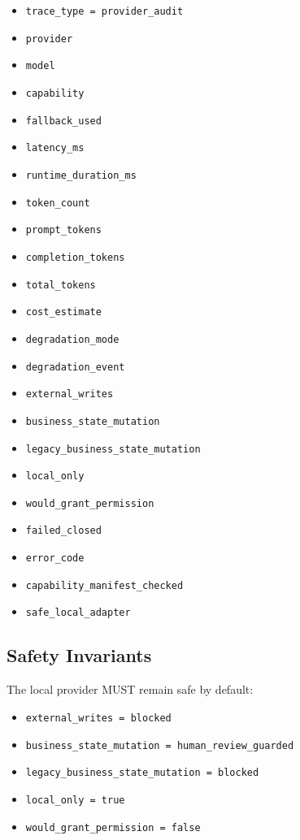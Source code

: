 \begin{itemize}
  \item \texttt{trace\_type = provider\_audit}
  \item \texttt{provider}
  \item \texttt{model}
  \item \texttt{capability}
  \item \texttt{fallback\_used}
  \item \texttt{latency\_ms}
  \item \texttt{runtime\_duration\_ms}
  \item \texttt{token\_count}
  \item \texttt{prompt\_tokens}
  \item \texttt{completion\_tokens}
  \item \texttt{total\_tokens}
  \item \texttt{cost\_estimate}
  \item \texttt{degradation\_mode}
  \item \texttt{degradation\_event}
  \item \texttt{external\_writes}
  \item \texttt{business\_state\_mutation}
  \item \texttt{legacy\_business\_state\_mutation}
  \item \texttt{local\_only}
  \item \texttt{would\_grant\_permission}
  \item \texttt{failed\_closed}
  \item \texttt{error\_code}
  \item \texttt{capability\_manifest\_checked}
  \item \texttt{safe\_local\_adapter}
\end{itemize}

\subsection{Safety Invariants}

The local provider MUST remain safe by default:

\begin{itemize}
  \item \texttt{external\_writes = blocked}
  \item \texttt{business\_state\_mutation = human\_review\_guarded}
  \item \texttt{legacy\_business\_state\_mutation = blocked}
  \item \texttt{local\_only = true}
  \item \texttt{would\_grant\_permission = false}
\end{itemize}

